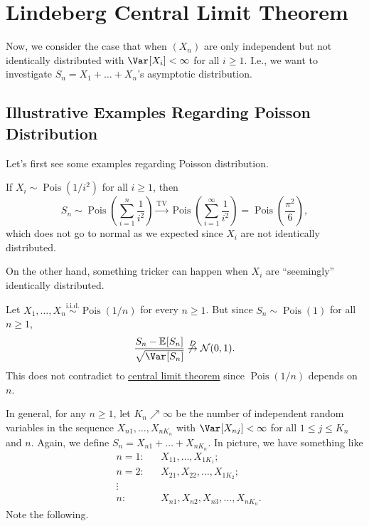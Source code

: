 \section{Lindeberg Central Limit Theorem}
Now, we consider the case that when \((X_n)\) are only independent but not identically distributed with \(\Var_{}[X_i] < \infty \) for all \(i \geq 1\). I.e., we want to investigate \(S_n = X_1 + \dots + X_n\)'s asymptotic distribution.

\subsection{Illustrative Examples Regarding Poisson Distribution}
Let's first see some examples regarding Poisson distribution.

\begin{eg}
	If \(X_i \sim \operatorname{Pois}(1 / i^2) \) for all \(i \geq 1\), then
	\[
		S_n \sim \operatorname{Pois}\left( \sum_{i=1}^{n} \frac{1}{i^2} \right)
		\overset{\operatorname{TV} }{\to} \operatorname{Pois}\left( \sum_{i=1}^{\infty} \frac{1}{i^2} \right)
		= \operatorname{Pois}\left( \frac{\pi ^2}{6} \right) ,
	\]
	which does not go to normal as we expected since \(X_i\) are not identically distributed.
\end{eg}

On the other hand, something tricker can happen when \(X_i\) are ``seemingly'' identically distributed.

\begin{eg}\label{eg:Poisson-CLT-fail}
	Let \(X_1, \dots , X_n \overset{\text{i.i.d.} }{\sim } \operatorname{Pois}(1 / n) \) for every \(n \geq 1\). But since \(S_n \sim \operatorname{Pois}(1) \) for all \(n \geq 1\),
	\[
		\frac{S_n - \mathbb{E}_{}[S_n] }{\sqrt{\Var_{}[S_n] } }
		\not \overset{D}{\to} \mathcal{N} (0, 1).
	\]
	This does not contradict to \hyperref[thm:CLT]{central limit theorem} since \(\operatorname{Pois}(1 / n) \) depends on \(n\).
\end{eg}

In general, for any \(n \geq 1\), let \(K_n \nearrow \infty \) be the number of independent random variables in the sequence \(X_{n1}, \dots , X_{n K_n}\) with \(\Var_{}[X_{nj}] < \infty \) for all \(1 \leq j \leq K_n\) and \(n\). Again, we define \(S_n = X_{n1} + \dots + X_{n K_n}\). In picture, we have something like
\[
	\begin{aligned}
		 & n=1 \colon &  & X_{11} , \dots , X_{1 K_1};                 \\
		 & n=2 \colon &  & X_{21}, X_{22} , \dots , X_{1 K_2};         \\
		 & \vdots     &  &                                             \\
		 & n \colon   &  & X_{n1} , X_{n2}, X_{n3}, \dots , X_{n K_n}.
	\end{aligned}
\]
Note the following.

